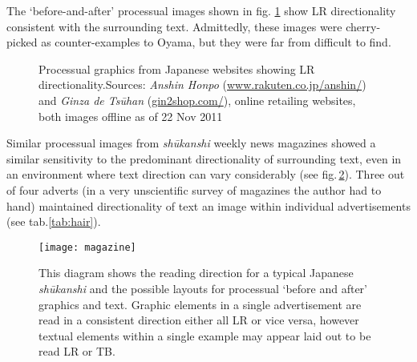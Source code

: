 \documentclass[11pt, oneside, a4paper]{scrartcl}
\begin{document}
The `before-and-after' processual images shown in fig. \ref{wigs} show LR directionality consistent with the surrounding text. Admittedly, these images were cherry-picked as counter-examples to Oyama, but they were far from difficult to find.

\begin{figure}[tb]
\begin{center}
\end{center}
\caption[Processual graphics from Japanese websites showing LR directionality.]{Processual graphics from Japanese websites showing LR directionality.\label{wigs}\newline \footnotesize Sources: \emph{Anshin Honpo} (\url{www.rakuten.co.jp/anshin/}) and \emph{Ginza de Tsūhan} (\url{gin2shop.com/}), online retailing websites, both images offline as of 22 Nov 2011}
\end{figure}

Similar processual images from \emph{shūkanshi} weekly news magazines showed a similar sensitivity to the predominant directionality of surrounding text, even in an environment where text direction can vary considerably (see fig.\,\ref{fig:mag}). Three out of four adverts (in a very unscientific survey of magazines the author had to hand) maintained directionality of text an image within individual advertisements (see tab.\ref{tab:hair}).

\begin{figure}[tb]
\begin{center}
\texttt{[image: magazine]}
\caption[Typical \textit{sh\={u}kanshi} reading route]{This diagram shows the reading direction for a typical Japanese \textit{sh\={u}kanshi} and the possible layouts for processual `before and after' graphics and text. Graphic elements in a single advertisement are read in a consistent direction either all LR or vice versa, however textual elements within a single example may appear laid out to be read LR or TB.\label{fig:mag}}
\end{center}
\end{figure}
\end{document}
